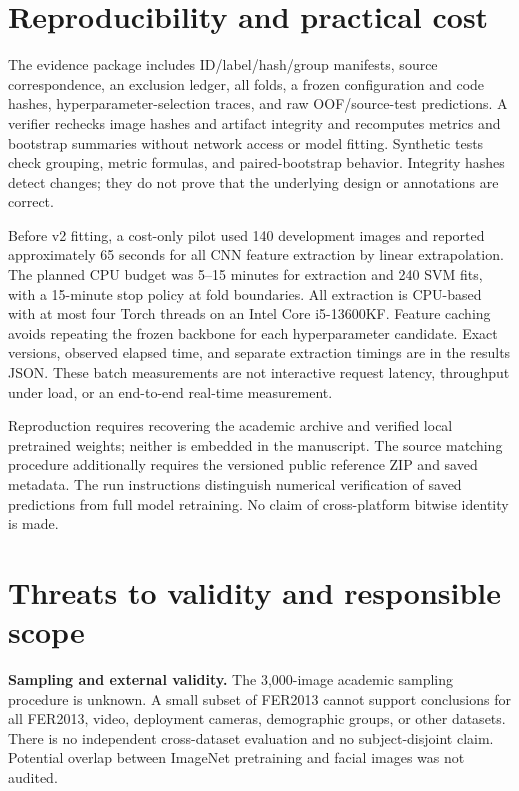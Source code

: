 \documentclass[11pt,a4paper]{article}
\begin{document}
\section{Reproducibility and practical cost}
The evidence package includes ID/label/hash/group manifests, source correspondence,
an exclusion ledger, all folds, a frozen configuration and code hashes,
hyperparameter-selection traces, and raw OOF/source-test predictions. A verifier
rechecks image hashes and artifact integrity and recomputes metrics and bootstrap
summaries without network access or model fitting. Synthetic tests check grouping,
metric formulas, and paired-bootstrap behavior. Integrity hashes detect changes;
they do not prove that the underlying design or annotations are correct.

Before v2 fitting, a cost-only pilot used 140 development images and reported
approximately 65 seconds for all CNN feature extraction by linear extrapolation.
The planned CPU budget was 5--15 minutes for extraction and 240 SVM fits, with a
15-minute stop policy at fold boundaries. All extraction is CPU-based with at
most four Torch threads on an Intel Core i5-13600KF. Feature caching avoids
repeating the frozen backbone for each hyperparameter candidate. Exact versions,
observed elapsed time, and separate extraction timings are in the results JSON.
These batch measurements are not interactive request latency, throughput under
load, or an end-to-end real-time measurement.

Reproduction requires recovering the academic archive and verified local
pretrained weights; neither is embedded in the manuscript. The source matching
procedure additionally requires the versioned public reference ZIP and saved
metadata. The run instructions distinguish numerical verification of saved
predictions from full model retraining. No claim of cross-platform bitwise
identity is made.

\section{Threats to validity and responsible scope}
\textbf{Sampling and external validity.} The 3,000-image academic sampling
procedure is unknown. A small subset of FER2013 cannot support conclusions for
all FER2013, video, deployment cameras, demographic groups, or other datasets.
There is no independent cross-dataset evaluation and no subject-disjoint claim.
Potential overlap between ImageNet pretraining and facial images was not audited.
\end{document}
